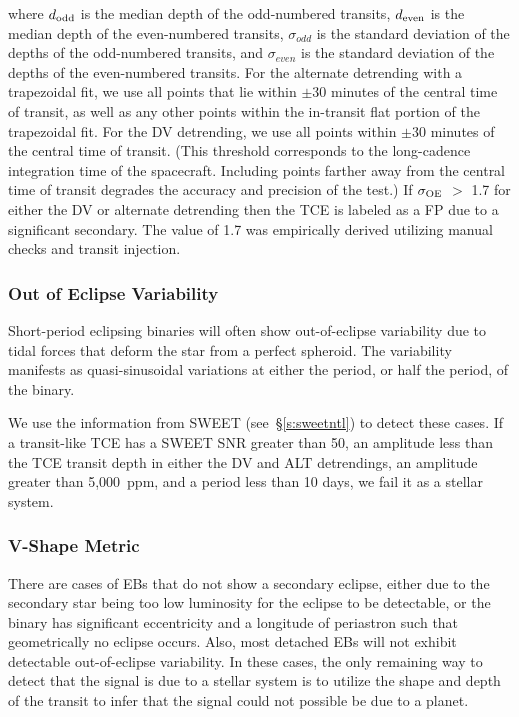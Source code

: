 \noindent where $d_{\rm odd}$ is the median depth of the odd-numbered transits, $d_{\rm even}$ is the median depth of the even-numbered transits, $\sigma_{odd}$ is the standard deviation of the depths of the odd-numbered transits, and $\sigma_{even}$ is the standard deviation of the depths of the even-numbered transits. For the alternate detrending with a trapezoidal fit, we use all points that lie within $\pm$30 minutes of the central time of transit, as well as any other points within the in-transit flat portion of the trapezoidal fit. For the DV detrending, we use all points within $\pm$30 minutes of the central time of transit. (This threshold corresponds to the long-cadence integration time of the \kepler{} spacecraft. Including points farther away from the central time of transit degrades the accuracy and precision of the test.) If $\sigma_{\rm OE}$ $>$ 1.7 for either the DV or alternate detrending then the TCE is labeled as a FP due to a significant secondary. The value of 1.7 was empirically derived utilizing manual checks and transit injection.


\subsubsection{Out of Eclipse Variability}
\label{s:sweeteb}
Short-period eclipsing binaries will often show out-of-eclipse variability due to tidal forces that deform the star from a perfect spheroid. The variability manifests as quasi-sinusoidal variations at either the period, or half the period, of the binary.

We use the information from SWEET (see~\S\ref{s:sweetntl}) to detect these cases. If a transit-like TCE has a SWEET SNR greater than 50, an amplitude less than the TCE transit depth in either the DV and ALT detrendings, an amplitude greater than 5,000~ppm, and a period less than 10 days, we fail it as a stellar system.



\subsubsection{V-Shape Metric}
\label{s:shapemetric}
There are cases of EBs that do not show a secondary eclipse, either due to the secondary star being too low luminosity for the eclipse to be detectable, or the binary has significant eccentricity and a longitude of periastron such that geometrically no eclipse occurs. Also, most detached EBs will not exhibit detectable out-of-eclipse variability. In these cases, the only remaining way to detect that the signal is due to a stellar system is to utilize the shape and depth of the transit to infer that the signal could not possible be due to a planet.

